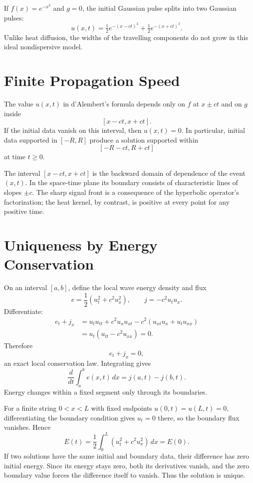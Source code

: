 If \(f(x)=e^{-x^2}\) and \(g=0\), the initial Gaussian pulse splits into two Gaussian pulses:
\[
 u(x,t)=\tfrac12e^{-(x-ct)^2}
        +\tfrac12e^{-(x+ct)^2}.
\]
Unlike heat diffusion, the widths of the travelling components do not grow in this ideal nondispersive model.

\section{Finite Propagation Speed}

The value \(u(x,t)\) in d'Alembert's formula depends only on \(f\) at \(x\pm ct\) and on \(g\) inside
\[
 [x-ct,x+ct].
\]
If the initial data vanish on this interval, then \(u(x,t)=0\). In particular, initial data supported in \([-R,R]\) produce a solution supported within
\[
 [-R-ct,R+ct]
\]
at time \(t\ge0\).

The interval \([x-ct,x+ct]\) is the backward domain of dependence of the event \((x,t)\). In the space-time plane its boundary consists of characteristic lines of slopes \(\pm c\). The sharp signal front is a consequence of the hyperbolic operator's factorization; the heat kernel, by contrast, is positive at every point for any positive time.

\section{Uniqueness by Energy Conservation}

On an interval \([a,b]\), define the local wave energy density and flux
\[
 e=\frac12(u_t^2+c^2u_x^2),\qquad
 j=-c^2u_tu_x.
\]
Differentiate:
\[
\begin{aligned}
 e_t+j_x
 &=u_tu_{tt}+c^2u_xu_{xt}
    -c^2(u_{xt}u_x+u_tu_{xx})\\
 &=u_t(u_{tt}-c^2u_{xx})=0.
\end{aligned}
\]
Therefore
\[
 \boxed{e_t+j_x=0,}
\]
an exact local conservation law. Integrating gives
\[
 \frac d{dt}\int_a^be(x,t)\,dx=j(a,t)-j(b,t).
\]
Energy changes within a fixed segment only through its boundaries.

For a finite string \(0<x<L\) with fixed endpoints \(u(0,t)=u(L,t)=0\), differentiating the boundary condition gives \(u_t=0\) there, so the boundary flux vanishes. Hence
\[
 \boxed{E(t)=\frac12\int_0^L
                  (u_t^2+c^2u_x^2)\,dx=E(0).}
\]
If two solutions have the same initial and boundary data, their difference has zero initial energy. Since its energy stays zero, both its derivatives vanish, and the zero boundary value forces the difference itself to vanish. Thus the solution is unique.

